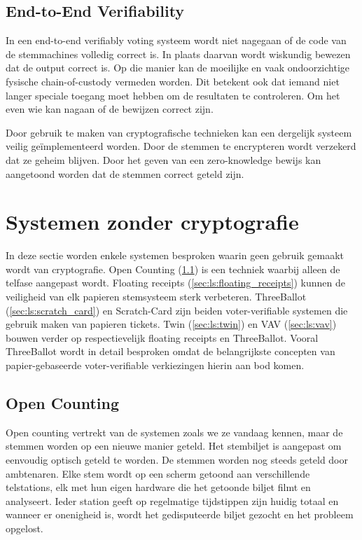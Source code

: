 \subsection{End-to-End Verifiability}
\label{sec:ls:end_to_end_verifiability}

In een end-to-end verifiably voting systeem wordt niet nagegaan of de code van de stemmachines volledig correct is. In plaats daarvan wordt wiskundig bewezen dat de output correct is. Op die manier kan de moeilijke en vaak ondoorzichtige fysische chain-of-custody vermeden worden. Dit betekent ook dat iemand niet langer speciale toegang moet hebben om de resultaten te controleren. Om het even wie kan nagaan of de bewijzen correct zijn.

\npar Door gebruik te maken van cryptografische technieken kan een dergelijk systeem veilig ge\"implementeerd worden. Door de stemmen te encrypteren wordt verzekerd dat ze geheim blijven. Door het geven van een zero-knowledge bewijs kan aangetoond worden dat de stemmen correct geteld zijn.

\section{Systemen zonder cryptografie}
\label{sec:ls:systemen_zonder_cryptografie}

In deze sectie worden enkele systemen besproken waarin geen gebruik gemaakt wordt van cryptografie. Open Counting (\ref{sec:ls:open_counting}) is een techniek waarbij alleen de telfase aangepast wordt. Floating receipts (\ref{sec:ls:floating_receipts}) kunnen de veiligheid van elk papieren stemsysteem sterk verbeteren. ThreeBallot (\ref{sec:ls:scratch_card}) en Scratch-Card zijn beiden voter-verifiable systemen die gebruik maken van papieren tickets. Twin (\ref{sec:ls:twin}) en VAV (\ref{sec:ls:vav}) bouwen verder op respectievelijk floating receipts en ThreeBallot. Vooral ThreeBallot wordt in detail besproken omdat de belangrijkste concepten van papier-gebaseerde voter-verifiable verkiezingen hierin aan bod komen.

\subsection{Open Counting}
\label{sec:ls:open_counting}

Open counting vertrekt van de systemen zoals we ze vandaag kennen, maar de stemmen worden op een nieuwe manier geteld.\cite{adi_schuler_frohlich_open_counting} Het stembiljet is aangepast om eenvoudig optisch geteld te worden. De stemmen worden nog steeds geteld door ambtenaren. Elke stem wordt op een scherm getoond aan verschillende telstations, elk met hun eigen hardware die het getoonde biljet filmt en analyseert. Ieder station geeft op regelmatige tijdstippen zijn huidig totaal en wanneer er onenigheid is, wordt het gedisputeerde biljet gezocht en het probleem opgelost.

